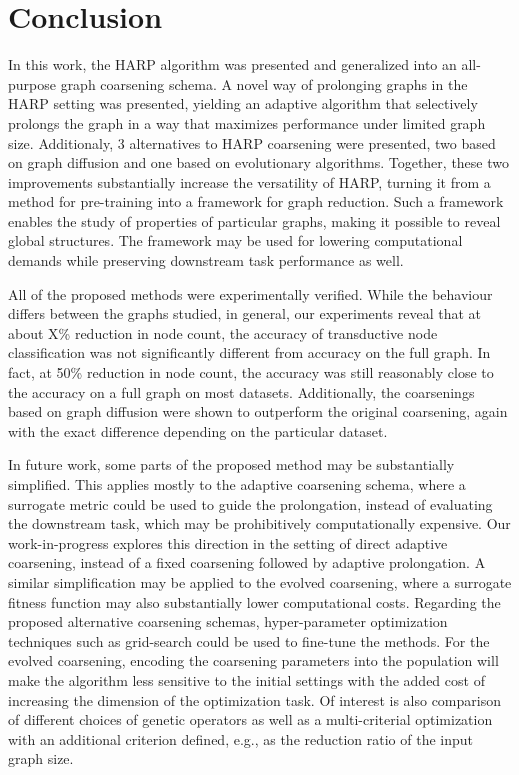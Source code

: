 \section{Conclusion}

In this work, the HARP algorithm was presented and generalized into an all-purpose graph coarsening schema. A novel way of prolonging graphs in the HARP setting was presented, yielding an adaptive algorithm that selectively prolongs the graph in a way that maximizes performance under limited graph size. Additionaly, 3 alternatives to HARP coarsening were presented, two based on graph diffusion and one based on evolutionary algorithms. Together, these two improvements substantially increase the versatility of HARP, turning it from a method for pre-training into a framework for graph reduction. Such a framework enables the study of properties of particular graphs, making it possible to reveal global structures. The framework may be used for lowering computational demands while preserving downstream task performance as well.

All of the proposed methods were experimentally verified. While the behaviour differs between the graphs studied, in general, our experiments reveal that at about X\% reduction in node count, the accuracy of transductive node classification was not significantly different from accuracy on the full graph. In fact, at 50\% reduction in node count, the accuracy was still reasonably close to the accuracy on a full graph on most datasets. Additionally, the coarsenings based on graph diffusion were shown to outperform the original coarsening, again with the exact difference depending on the particular dataset.

In future work, some parts of the proposed method may be substantially simplified. This applies mostly to the adaptive coarsening schema, where a surrogate metric could be used to guide the prolongation, instead of evaluating the downstream task, which may be prohibitively computationally expensive. Our work-in-progress  explores this direction in the setting of direct adaptive coarsening, instead of a fixed coarsening followed by adaptive prolongation. A similar simplification may be applied to the evolved coarsening, where a surrogate fitness function may also substantially lower computational costs. Regarding the proposed alternative coarsening schemas, hyper-parameter optimization techniques such as grid-search could be used to fine-tune the methods. For the evolved coarsening, encoding the coarsening parameters into the population will make the algorithm less sensitive to the initial settings with the added cost of increasing the dimension of the optimization task. Of interest is also comparison of different choices of genetic operators as well as a multi-criterial optimization with an additional criterion defined, e.g., as the reduction ratio of the input graph size.
